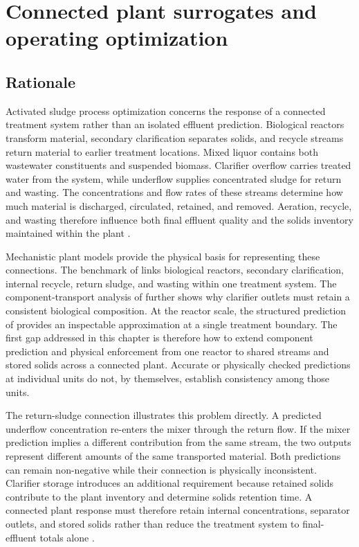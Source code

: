\chapter{Connected plant surrogates and operating optimization}
\label{ch:plant}

\section{Rationale}

Activated sludge process optimization concerns the response of a connected treatment system rather than an isolated effluent prediction. Biological reactors transform material, secondary clarification separates solids, and recycle streams return material to earlier treatment locations. Mixed liquor contains both wastewater constituents and suspended biomass. Clarifier overflow carries treated water from the system, while underflow supplies concentrated sludge for return and wasting. The concentrations and flow rates of these streams determine how much material is discharged, circulated, retained, and removed. Aeration, recycle, and wasting therefore influence both final effluent quality and the solids inventory maintained within the plant \citep{Henze2008,HartelPopel1992}.

Mechanistic plant models provide the physical basis for representing these connections. The benchmark of \citet{Alex2008} links biological reactors, secondary clarification, internal recycle, return sludge, and wasting within one treatment system. The component-transport analysis of \citet{JeppssonDiehl1996} further shows why clarifier outlets must retain a consistent biological composition. At the reactor scale, the structured prediction of \citet{Selerio2026} provides an inspectable approximation at a single treatment boundary. The first gap addressed in this chapter is therefore how to extend component prediction and physical enforcement from one reactor to shared streams and stored solids across a connected plant. Accurate or physically checked predictions at individual units do not, by themselves, establish consistency among those units.

The return-sludge connection illustrates this problem directly. A predicted underflow concentration re-enters the mixer through the return flow. If the mixer prediction implies a different contribution from the same stream, the two outputs represent different amounts of the same transported material. Both predictions can remain non-negative while their connection is physically inconsistent. Clarifier storage introduces an additional requirement because retained solids contribute to the plant inventory and determine solids retention time. A connected plant response must therefore retain internal concentrations, separator outlets, and stored solids rather than reduce the treatment system to final-effluent totals alone \citep{Alex2008,JeppssonDiehl1996}.

